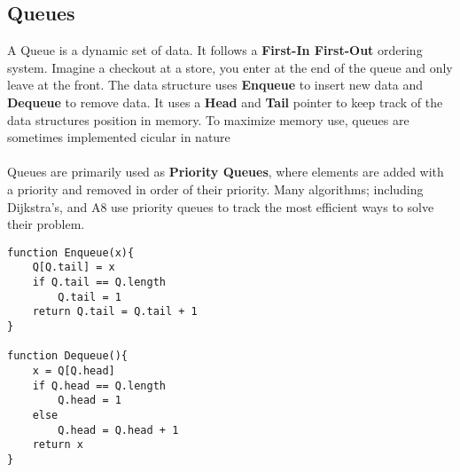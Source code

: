 \documentclass{article}
\begin{document}
\hspace{1 cm} \raisebox{0.5cm}{$\rightarrow$} \hspace{1 cm}
\hspace{1 cm} \raisebox{0.5cm}{$\rightarrow$} \hspace{1 cm}



\subsection{Queues}
A Queue is a dynamic set of data. It follows a {\bf First-In First-Out} ordering system. Imagine a checkout at a store, you enter at the end of the queue and only leave at the front. The data structure uses {\bf Enqueue} to insert new data and {\bf Dequeue} to remove data. It uses a {\bf Head} and {\bf Tail} pointer to keep track of the data structures position in memory. To maximize memory use, queues are sometimes implemented cicular in nature
\\ \\
Queues are primarily used as {\bf Priority Queues}, where elements are added with a priority and removed in order of their priority. Many algorithms; including Dijkstra's, and A8 use priority queues to track the most efficient ways to solve their problem.
\begin{lstlisting}[style=pseudo]
function Enqueue(x){
	Q[Q.tail] = x
	if Q.tail == Q.length
		Q.tail = 1
	return Q.tail = Q.tail + 1
}

function Dequeue(){
	x = Q[Q.head]
	if Q.head == Q.length
		Q.head = 1
	else
		Q.head = Q.head + 1
	return x
}
\end{lstlisting}
\end{document}
